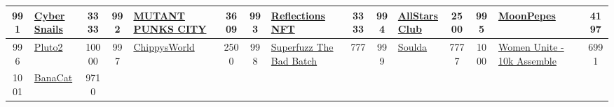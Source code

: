 \begin{table*}[]
{\begin{tabular}{|c|l|c|c|l|c|c|l|c|c|l|c|c|l|c|}
        991   & \href{https://www.cybersnails.com/}{Cyber Snails}                                  & 3333              & 992   & \href{https://mutantpunkscity.com/}{MUTANT PUNKS CITY}                                            & 3609              & 993   & \href{http://reflectionsnft.io}{Reflections NFT}                                  & 3333              & 994   & \href{https://www.allstarsclubnft.com/}{AllStarsClub}                         & 2500              & 995   & \href{https://nft-generator.art/mints/cl4x4b9qz64420gewb8028dzf}{MoonPepes}               & 4197                                    \\ \hline
        996   & \href{https://v2.plutoalliance.com/\#/}{Pluto2}                                    & 10000             & 997   & \href{https://chippysworld.io/}{ChippysWorld}                                                     & 2500              & 998   & \href{https://superfuzz.io/}{Superfuzz The Bad Batch}                             & 777               & 999   & \href{https://soulda16.club/}{Soulda}                                         & 7777              & 1000  & \href{https://opensea.io/collection/women-unite-10k-assemble}{Women Unite - 10k Assemble} & 6991                                    \\ \hline
        1001  & \href{https://opensea.io/collection/banacat-v2}{BanaCat}                           & 9710              &       &                                                                                                  &                   &       &                                                                                  &                   &       &                                                                              &                   &       &                                                                                          &                                         \\ \hline
        \end{tabular}
        }
        \end{table*}